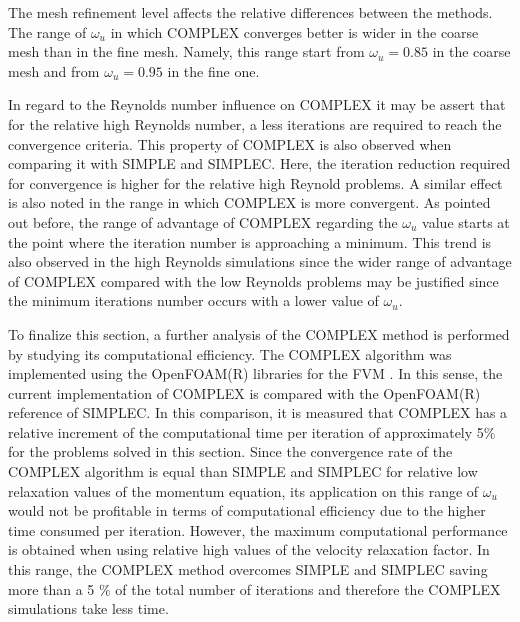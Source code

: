 \documentclass[final,3p,times,11pt,onecolumn]{myElsarticle}
\numberwithin{equation}{section}
\begin{document}
The mesh refinement level affects the relative differences between the methods. The range of $\omega_u$ in which COMPLEX converges better is wider in the coarse mesh than in the fine mesh. Namely, this range start from $\omega_u = 0.85$ in the coarse mesh and from $\omega_u = 0.95$ in the fine one.

In regard to the Reynolds number influence on COMPLEX it may be assert that for the relative high Reynolds number, a less iterations are required to reach the convergence criteria. This property of COMPLEX is also observed when comparing it with SIMPLE and SIMPLEC. Here, the iteration reduction required for convergence is higher for the relative high Reynold problems. A similar effect is also noted in the range in which COMPLEX is more convergent. As pointed out before, the range of advantage of COMPLEX regarding the $\omega_u$ value starts at the point where the iteration number is approaching a minimum. This trend is also observed in the high Reynolds simulations since the wider range of advantage of COMPLEX compared with the low Reynolds problems may be justified since the minimum iterations number occurs with a lower value of $\omega_u$.


To finalize this section, a further analysis of the COMPLEX method is performed by studying its computational efficiency. The  COMPLEX algorithm was implemented using the OpenFOAM(R)  libraries for the FVM \cite{ofpg}. In this sense, the current implementation of COMPLEX is compared with the OpenFOAM(R) reference of SIMPLEC. In this comparison, it is measured that COMPLEX  has a relative increment of the computational time per iteration of approximately 5$\%$  for the problems solved in this section. Since the convergence rate of the COMPLEX algorithm is equal than SIMPLE and SIMPLEC for relative low relaxation values of the momentum equation, its application on this range of $\omega_u$ would not be profitable in terms of computational efficiency due to the higher time consumed per iteration. However, the maximum computational performance is obtained when using relative high values of the velocity relaxation factor. In this range, the COMPLEX method overcomes SIMPLE and SIMPLEC saving more than a 5 $\%$ of the total number of iterations and therefore the COMPLEX simulations take less time. 
\end{document}
